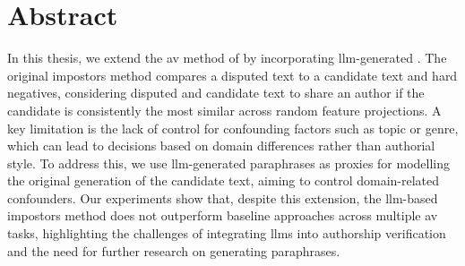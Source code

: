 \chapter*{Abstract}

In this thesis, we extend the \acl{av} method of \citet{koppel_determining_2014} by incorporating \acs{llm}-generated \imps{}. 
The original impostors method compares a disputed text to a candidate text and hard negatives, considering disputed and candidate text to share an author if the candidate is consistently the most similar across random feature projections. 
A key limitation is the lack of control for confounding factors such as topic or genre, which can lead to decisions based on domain differences rather than authorial style. 
To address this, we use \acs{llm}-generated paraphrases as proxies for modelling the original generation of the candidate text, aiming to control domain-related confounders. 
Our experiments show that, despite this extension, the \acs{llm}-based impostors method does not outperform baseline approaches across multiple \acl{av} tasks, highlighting the challenges of integrating \acsp{llm} into authorship verification and the need for further research on generating paraphrases.

